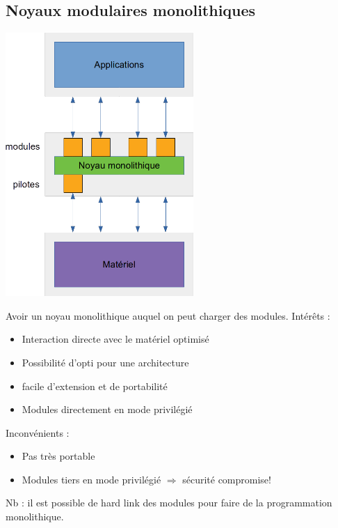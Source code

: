 \subsection{Noyaux modulaires monolithiques}
\begin{center}
  \includegraphics[height=10cm]{cours1/pics/cours1_monolithmod.png}
\end{center}
Avoir un noyau monolithique auquel on peut charger des modules.
Intérêts :
\begin{itemize}
  \item Interaction directe avec le matériel optimisé
  \item Possibilité d'opti pour une architecture
  \item facile d'extension et de portabilité
  \item Modules directement en mode privilégié
\end{itemize}
Inconvénients :
\begin{itemize}
  \item Pas très portable
  \item Modules tiers en mode privilégié $\Rightarrow$ sécurité compromise!
\end{itemize}
Nb : il est possible de hard link des modules pour faire de la programmation
monolithique.
